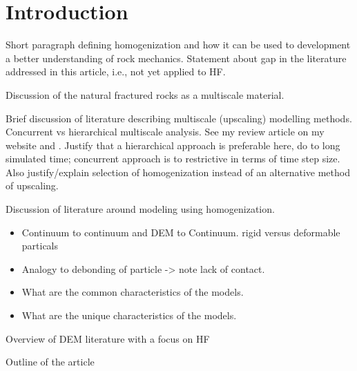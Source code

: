 \section{Introduction}
Short paragraph defining homogenization and how it can be used to development a better understanding of rock mechanics.  Statement about gap in the literature addressed in this article, i.e., not yet applied to HF.

Discussion of the natural fractured rocks as a multiscale material.

Brief discussion of literature describing multiscale (upscaling)  modelling methods.  Concurrent vs hierarchical multiscale analysis.  See my review article on my website and \cite{Gracie_2011}. Justify that a hierarchical approach is preferable here, do to long simulated time; concurrent approach is to restrictive in terms of time step size. Also justify/explain selection of homogenization instead of an alternative method of upscaling.

Discussion of literature around modeling using homogenization.
\begin{itemize}
\item Continuum to continuum and DEM to Continuum. rigid versus deformable particals
\item Analogy to debonding of particle -> note lack of contact.
\item What are the common characteristics of the models.
\item What are the unique characteristics of the models.  
\end{itemize} 

Overview of DEM literature with a focus on HF

Outline of the article
